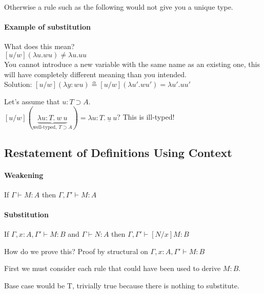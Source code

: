 \documentclass[12 pt]{article}
\begin{document}
    \begin{prooftree}
    \end{prooftree}

    Otherwise a rule such as the following would not give you
    a unique type.
    \begin{prooftree}
    \end{prooftree}
    \paragraph{Example of substitution} What does this mean?
    \\ $[u/w] (\lambda u.w u) \neq \lambda u. u u$
    \\ You cannot introduce a new variable with the same name as an
    existing one, this will have completely different meaning than you
    intended.
    \\ Solution: $[u/w](\lambda y: w
    u)\stackrel{\alpha}{=}[u/w](\lambda u'. w u') = \lambda u'. u u'$

    Let's assume that $u : T \supset A$.
    \\ $[u/w](\underbrace{\lambda u : T. \ w \ u}_{\text{well-typed, $T
        \supset A$}}) = \lambda u : T. \ \underline{u} \ u$? This is
    ill-typed!
    \subsection{Restatement of Definitions Using Context}
    \paragraph{Weakening} If $\Gamma \vdash M:A$ then $\Gamma, \Gamma'
    \vdash M:A$
    \paragraph{Substitution} If $\Gamma, x : A , \Gamma' \vdash M : B$
    and $\Gamma \vdash N : A$ then $\Gamma, \Gamma' \vdash [N/x] M : B$

    How do we prove this? Proof by structural on $\Gamma, x: A,
    \Gamma' \vdash M : B$

    First we must consider each rule that could have been used to derive
    $M : B$.

    Base case would be T, trivially true because there is nothing to
    substitute.
\end{document}
